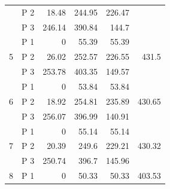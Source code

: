 \documentclass[conference]{IEEEtran}
\begin{document}
\begin{table}[]
\begin{tabular}{@{}llrrrr@{}}
                    & P 2     & 18.48                          & 244.95                       & 226.47                                  &                                               \\
                    & P 3     & 246.14                         & 390.84                       & 144.7                                   &                                               \\
\multirow{3}{*}{5}  & P 1     & 0                              & 55.39                        & 55.39                                   & \multirow{3}{*}{431.5}                        \\
                    & P 2     & 26.02                          & 252.57                       & 226.55                                  &                                               \\
                    & P 3     & 253.78                         & 403.35                       & 149.57                                  &                                               \\
\multirow{3}{*}{6}  & P 1     & 0                              & 53.84                        & 53.84                                   & \multirow{3}{*}{430.65}                       \\
                    & P 2     & 18.92                          & 254.81                       & 235.89                                  &                                               \\
                    & P 3     & 256.07                         & 396.99                       & 140.91                                  &                                               \\
\multirow{3}{*}{7}  & P 1     & 0                              & 55.14                        & 55.14                                   & \multirow{3}{*}{430.32}                       \\
                    & P 2     & 20.39                          & 249.6                        & 229.21                                  &                                               \\
                    & P 3     & 250.74                         & 396.7                        & 145.96                                  &                                               \\
\multirow{3}{*}{8}  & P 1     & 0                              & 50.33                        & 50.33                                   & \multirow{3}{*}{403.53}                       \\

\end{tabular}
\end{table}
\end{document}
